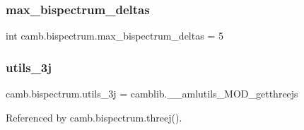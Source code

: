 \subsubsection{\texorpdfstring{max\+\_\+bispectrum\+\_\+deltas}{max\_bispectrum\_deltas}}
{\footnotesize\ttfamily int camb.\+bispectrum.\+max\+\_\+bispectrum\+\_\+deltas = 5}

\mbox{\label{namespacecamb_1_1bispectrum_a01b9e7316197b6f732d61344237b5daf}} 
\subsubsection{\texorpdfstring{utils\+\_\+3j}{utils\_3j}}
{\footnotesize\ttfamily camb.\+bispectrum.\+utils\+\_\+3j = camblib.\+\_\+\+\_\+amlutils\+\_\+\+M\+O\+D\+\_\+getthreejs}



Referenced by camb.\+bispectrum.\+threej().

